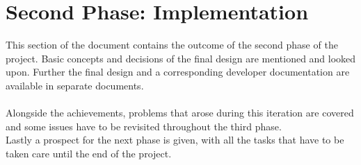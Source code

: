 \section{Second Phase: Implementation}
This section of the document contains the outcome of the second phase of the project. Basic concepts and decisions of the final design are mentioned and looked upon. Further the final design and a corresponding developer documentation are available in separate documents. \\
~\\
Alongside the achievements, problems that arose during this iteration are covered and some issues have to be revisited throughout the third phase. \\
Lastly a prospect for the next phase is given, with all the tasks that have to be taken care until the end of the project. 